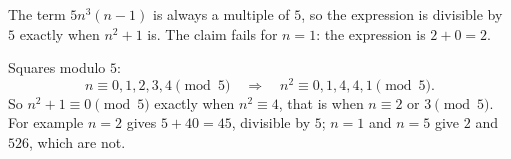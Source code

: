 The term $5n^3(n-1)$ is always a multiple of $5$, so the expression is divisible by $5$ exactly when $n^2+1$ is. The claim fails for $n=1$: the expression is $2+0=2$.

Squares modulo $5$:
\[
n\equiv0,1,2,3,4\pmod5\quad\Longrightarrow\quad n^2\equiv0,1,4,4,1\pmod5 .
\]
So $n^2+1\equiv0\pmod5$ exactly when $n^2\equiv4$, that is when $\boxed{n\equiv2\text{ or }3\pmod5}$. For example $n=2$ gives $5+40=45$, divisible by $5$; $n=1$ and $n=5$ give $2$ and $526$, which are not.
